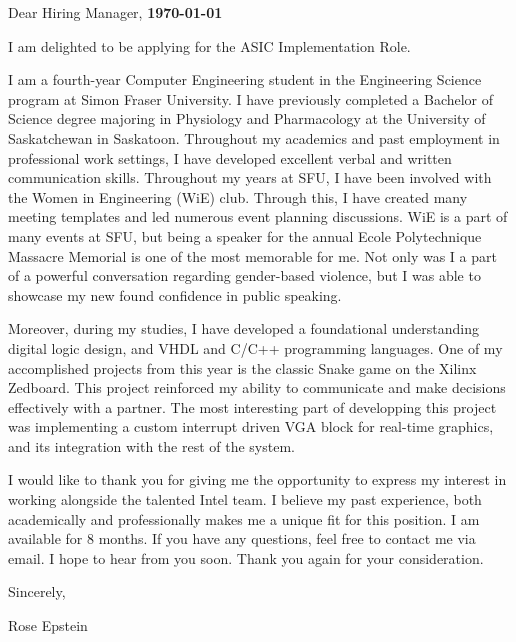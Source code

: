 \documentclass[letterpaper,11pt]{article}
\newcommand{\roleName}{ASIC Implementation Role}
\begin{document}
    \vspace*{10pt}
    \par Dear Hiring Manager,  \hfill \textbf{\today}
    \vspace*{10pt}
    \par I am delighted to be applying for the \roleName{}.
    \vspace*{10pt}
    \par I am a fourth-year Computer Engineering student in the Engineering Science program at Simon Fraser University. I have 
    previously completed a Bachelor of Science degree majoring in Physiology and Pharmacology at the University of Saskatchewan in Saskatoon.
    Throughout my academics and past employment in professional work settings, I have developed excellent verbal and written communication skills. 
    Throughout my years at SFU, I have been involved with the Women in Engineering (WiE) club. Through this, I have created many meeting templates and led numerous event planning discussions. 
    WiE is a part of many events at SFU, but being a speaker for the annual Ecole Polytechnique Massacre Memorial is one of the most memorable for me. 
    Not only was I a part of a powerful conversation regarding gender-based violence, but I was able to showcase my new found confidence in public speaking. 
    \vspace*{10pt}
    \par Moreover, during my studies, I have developed a foundational understanding digital logic design, and VHDL and C/C++ programming languages. One of my accomplished projects from this year is the classic Snake game
    on the Xilinx Zedboard. This project reinforced my ability to communicate and make decisions effectively with a partner. 
    The most interesting part of developping this project was implementing a custom interrupt driven VGA block for real-time graphics, 
    and its integration with the rest of the system.
    \vspace*{10pt}
    \par I would like to thank you for giving me the opportunity to express my interest in working alongside
    the talented Intel team. I believe my past experience, both academically and professionally makes
    me a unique fit for this position. I am available for 8 months. If you have any questions, feel free to contact me via email. I hope to hear from you
    soon. Thank you again for your consideration.
    \vspace*{10pt}
    \par Sincerely,
    \par Rose Epstein
\end{document}

